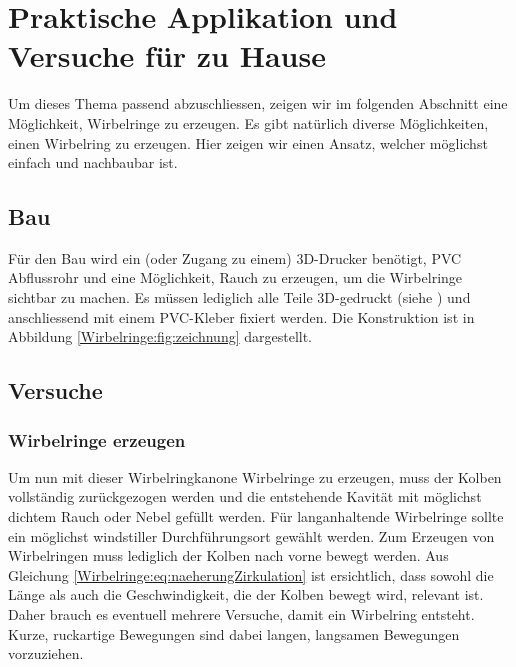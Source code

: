 %
%
%
\section{Praktische Applikation und Versuche für zu Hause}

Um dieses Thema passend abzuschliessen, zeigen wir im folgenden Abschnitt eine Möglichkeit, Wirbelringe zu erzeugen.
Es gibt natürlich diverse Möglichkeiten, einen Wirbelring zu erzeugen. 
Hier zeigen wir einen Ansatz, welcher möglichst einfach und nachbaubar ist.

\subsection{Bau}


Für den Bau wird ein (oder Zugang zu einem) 3D-Drucker benötigt,  PVC Abflussrohr und eine Möglichkeit, Rauch zu erzeugen, um die Wirbelringe sichtbar zu machen. 
Es müssen lediglich alle Teile 3D-gedruckt (siehe \cite{Wirbelringe:3D_modelle}) und anschliessend mit einem PVC-Kleber fixiert werden. 
Die Konstruktion ist in Abbildung \ref{Wirbelringe:fig:zeichnung} dargestellt.

\subsection{Versuche}

\subsubsection{Wirbelringe erzeugen\label{Wirbelringe:wirbelringeerzeugen}}

Um nun mit dieser Wirbelringkanone Wirbelringe zu erzeugen, muss der Kolben vollständig zurückgezogen werden und die entstehende Kavität mit möglichst dichtem Rauch oder Nebel gefüllt werden.
Für langanhaltende Wirbelringe sollte ein möglichst windstiller Durchführungsort gewählt werden.
Zum Erzeugen von Wirbelringen muss lediglich der Kolben nach vorne bewegt werden.
Aus Gleichung \eqref{Wirbelringe:eq:naeherungZirkulation} ist ersichtlich, dass sowohl die Länge als auch die Geschwindigkeit, die der Kolben bewegt wird, relevant ist.
Daher brauch es eventuell mehrere Versuche, damit ein Wirbelring entsteht.
Kurze, ruckartige Bewegungen sind dabei langen, langsamen Bewegungen vorzuziehen.

